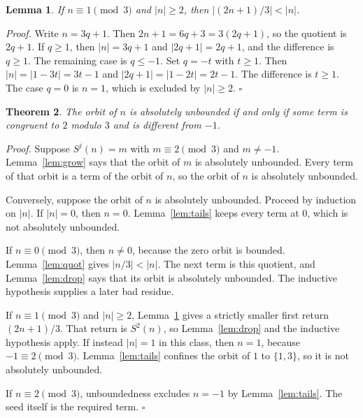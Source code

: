 \documentclass[11pt,letterpaper]{article}
\newtheorem{theorem}{Theorem}
\newtheorem{lemma}[theorem]{Lemma}
\newenvironment{proof}{\noindent\textit{Proof.}}{\hfill\(\square\)}
\begin{document}
\begin{lemma}
\label{lem:returnabs}
If \(n\equiv 1\pmod{3}\) and \(\lvert n\rvert\ge 2\), then \(\lvert(2n+1)/3\rvert<\lvert n\rvert\).
\end{lemma}

\begin{proof}
Write \(n=3q+1\). Then \(2n+1=6q+3=3(2q+1)\), so the quotient is \(2q+1\). If \(q\ge 1\), then \(\lvert n\rvert=3q+1\) and \(\lvert 2q+1\rvert=2q+1\), and the difference is \(q\ge 1\). The remaining case is \(q\le -1\). Set \(q=-t\) with \(t\ge 1\). Then \(\lvert n\rvert=\lvert 1-3t\rvert=3t-1\) and \(\lvert 2q+1\rvert=\lvert 1-2t\rvert=2t-1\). The difference is \(t\ge 1\). The case \(q=0\) is \(n=1\), which is excluded by \(\lvert n\rvert\ge 2\).
\end{proof}

\begin{theorem}
\label{thm:unbounded}
The orbit of \(n\) is absolutely unbounded if and only if some term is congruent to \(2\) modulo \(3\) and is different from \(-1\).
\end{theorem}

\begin{proof}
Suppose \(S^{j}(n)=m\) with \(m\equiv 2\pmod{3}\) and \(m\neq -1\). Lemma~\ref{lem:grow} says that the orbit of \(m\) is absolutely unbounded. Every term of that orbit is a term of the orbit of \(n\), so the orbit of \(n\) is absolutely unbounded.

Conversely, suppose the orbit of \(n\) is absolutely unbounded. Proceed by induction on \(\lvert n\rvert\). If \(\lvert n\rvert=0\), then \(n=0\). Lemma~\ref{lem:tails} keeps every term at \(0\), which is not absolutely unbounded.

If \(n\equiv 0\pmod{3}\), then \(n\neq 0\), because the zero orbit is bounded. Lemma~\ref{lem:quot} gives \(\lvert n/3\rvert<\lvert n\rvert\). The next term is this quotient, and Lemma~\ref{lem:drop} says that its orbit is absolutely unbounded. The inductive hypothesis supplies a later bad residue.

If \(n\equiv 1\pmod{3}\) and \(\lvert n\rvert\ge 2\), Lemma~\ref{lem:returnabs} gives a strictly smaller first return \((2n+1)/3\). That return is \(S^{2}(n)\), so Lemma~\ref{lem:drop} and the inductive hypothesis apply. If instead \(\lvert n\rvert=1\) in this class, then \(n=1\), because \(-1\equiv 2\pmod{3}\). Lemma~\ref{lem:tails} confines the orbit of \(1\) to \(\{1,3\}\), so it is not absolutely unbounded.

If \(n\equiv 2\pmod{3}\), unboundedness excludes \(n=-1\) by Lemma~\ref{lem:tails}. The seed itself is the required term.
\end{proof}
\end{document}

